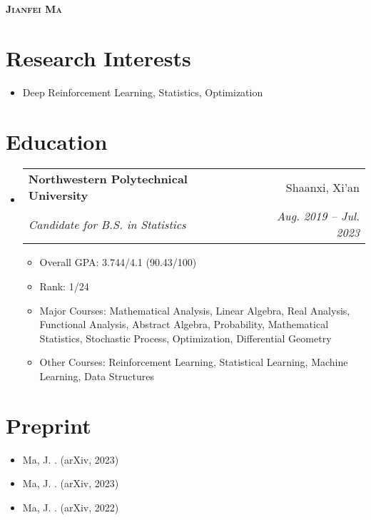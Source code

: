 \documentclass[letterpaper,11pt]{article}
\makeatletter
\newcommand{\resumeItem}[1]{
  \item\small{
    {#1 \vspace{-2pt}}
  }
}
\newcommand{\resumeSubheading}[4]{
  \vspace{-2pt}\item
    \begin{tabular*}{0.97\textwidth}[t]{l@{\extracolsep{\fill}}r}
      \textbf{#1} & #2 \\
      \textit{\small#3} & \textit{\small #4} \\
    \end{tabular*}\vspace{-7pt}
}
\newcommand{\resumeSubHeadingListStart}{\begin{itemize}[leftmargin=0.15in, label={}]}
\newcommand{\resumeSubHeadingListEnd}{\end{itemize}}
\newcommand{\resumeItemListStart}{\begin{itemize}}
\newcommand{\resumeItemListEnd}{\end{itemize}\vspace{-5pt}}
\makeatother
\begin{document}

\begin{center}
    \textbf{\Huge \scshape Jianfei Ma} \\ \vspace{1pt}
    \small{\item{
     {\href{mailto:matrixfeeney@gmail.com}{}}
    {\href{https://github.com/MagiFeeney}{}}     
     {\href{https://magifeeney.github.io}{}}       
    }}
\end{center}

\section{Research Interests}
  \resumeSubHeadingListStart
    \resumeItem
      {Deep Reinforcement Learning, Statistics, Optimization}%
  \resumeSubHeadingListEnd

\section{Education}
  \resumeSubHeadingListStart
    \resumeSubheading
      {Northwestern Polytechnical University}{Shaanxi, Xi'an}
      {Candidate for B.S. in Statistics}{Aug. 2019 -- Jul. 2023}
    \resumeItemListStart
      \resumeItem
      {Overall GPA: 3.744/4.1 (90.43/100)}
     \resumeItem
      {Rank: 1/24}
     \resumeItem
      {Major Courses: Mathematical Analysis, Linear Algebra, Real Analysis, Functional Analysis, Abstract Algebra, Probability, Mathematical Statistics, Stochastic Process, Optimization, Differential Geometry}
      \resumeItem
      {Other Courses: Reinforcement Learning, Statistical Learning, Machine Learning, Data Structures}
    \resumeItemListEnd
  \resumeSubHeadingListEnd

\section{Preprint}
      \resumeItemListStart
        \resumeItem{Ma, J. \href{https://arxiv.org/abs/2310.08091}{\color{darkblue}{Discerning Temporal Difference Learning}}. (arXiv, 2023)}
        \resumeItem{Ma, J. \href{https://arxiv.org/abs/2302.00533}{\color{darkblue}{Distillation Policy Optimization}}. (arXiv, 2023)}
        \resumeItem{Ma, J. \href{https://arxiv.org/abs/2208.09322v2}{\color{darkblue}{Entropy Augmented Reinforcement Learning}}. (arXiv, 2022)}
      \resumeItemListEnd
      
\end{document}
